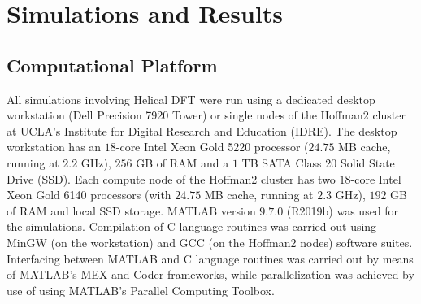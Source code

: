 \documentclass[preprint,12pt, 3p, sort&compress]{elsarticle}
\begin{document}
\section{Simulations and Results}
\label{sec:simulation_results}
\subsection{Computational Platform}
\label{subsec:comp_platform}
All simulations involving Helical DFT were run using a dedicated desktop workstation (Dell Precision 7920 Tower) or single nodes of the Hoffman2 cluster at UCLA's Institute for Digital Research and Education (IDRE). The desktop workstation has an $18$-core Intel Xeon Gold 5220 processor ($24.75$ MB cache, running at $2.2$ GHz), $256$ GB of RAM and a $1$ TB SATA Class 20 Solid State Drive (SSD). Each compute node of the Hoffman2 cluster has two $18$-core Intel Xeon Gold 6140 processors (with $24.75$ MB cache, running at $2.3$ GHz), $192$ GB of RAM and local SSD storage. MATLAB version $9.7.0$ (R2019b) was used for the simulations. Compilation of C language routines was carried out using MinGW (on the workstation) and GCC (on the Hoffman2 nodes) software suites. Interfacing between MATLAB and C language routines was carried out by means of MATLAB's MEX and Coder frameworks, while parallelization was achieved by use of using MATLAB's Parallel Computing Toolbox.
\end{document}
